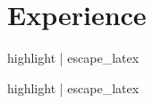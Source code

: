 \documentclass[10pt]{resume}
\begin{document}

{%
\vspace{0.5em}
{%
{%

\section{Experience}

{%
{%
{%
{%
{%
{%
\expblock
{%
{
{%
    \item {{ highlight | escape_latex }}
{%
}
{%

{%
{%
{%
{%
{%
{%
\expblock
{%
{
{%
    \item {{ highlight | escape_latex }}
{%
}
{%

}}}}}}}}}}}}}}}}}}}}}}}
\end{document}
